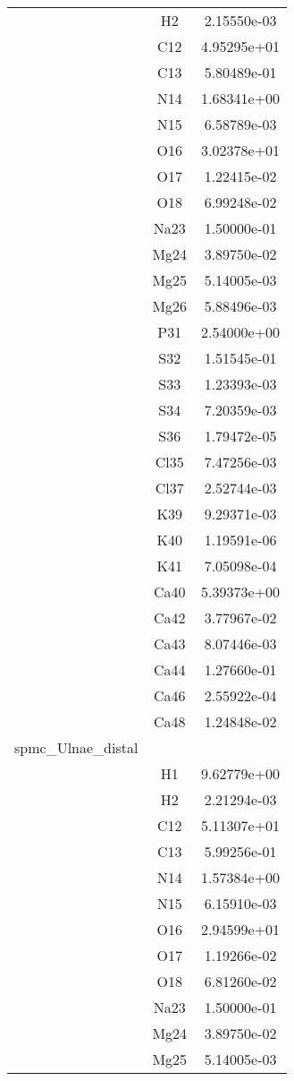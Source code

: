 \begin{centering}
\begin{longtable}{l c c}
& H2 & 2.15550e-03 \\ 
& C12 & 4.95295e+01 \\ 
& C13 & 5.80489e-01 \\ 
& N14 & 1.68341e+00 \\ 
& N15 & 6.58789e-03 \\ 
& O16 & 3.02378e+01 \\ 
& O17 & 1.22415e-02 \\ 
& O18 & 6.99248e-02 \\ 
& Na23 & 1.50000e-01 \\ 
& Mg24 & 3.89750e-02 \\ 
& Mg25 & 5.14005e-03 \\ 
& Mg26 & 5.88496e-03 \\ 
& P31 & 2.54000e+00 \\ 
& S32 & 1.51545e-01 \\ 
& S33 & 1.23393e-03 \\ 
& S34 & 7.20359e-03 \\ 
& S36 & 1.79472e-05 \\ 
& Cl35 & 7.47256e-03 \\ 
& Cl37 & 2.52744e-03 \\ 
& K39 & 9.29371e-03 \\ 
& K40 & 1.19591e-06 \\ 
& K41 & 7.05098e-04 \\ 
& Ca40 & 5.39373e+00 \\ 
& Ca42 & 3.77967e-02 \\ 
& Ca43 & 8.07446e-03 \\ 
& Ca44 & 1.27660e-01 \\ 
& Ca46 & 2.55922e-04 \\ 
& Ca48 & 1.24848e-02 \\ 
\hline
spmc\_Ulnae\_distal & & \\
\hline
& H1 & 9.62779e+00 \\ 
& H2 & 2.21294e-03 \\ 
& C12 & 5.11307e+01 \\ 
& C13 & 5.99256e-01 \\ 
& N14 & 1.57384e+00 \\ 
& N15 & 6.15910e-03 \\ 
& O16 & 2.94599e+01 \\ 
& O17 & 1.19266e-02 \\ 
& O18 & 6.81260e-02 \\ 
& Na23 & 1.50000e-01 \\ 
& Mg24 & 3.89750e-02 \\ 
& Mg25 & 5.14005e-03 \\ 

\end{longtable}
\end{centering}
